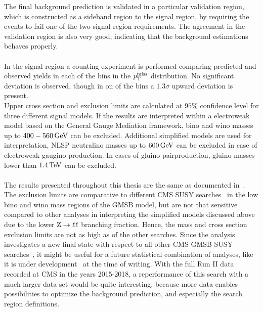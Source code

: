 The final background prediction is validated in a particular validation region, which is constructed as a sideband region to the signal region, by requiring the events to fail one of the two signal region requirements. The agreement in the validation region is also very good, indicating that the background estimations behaves properly.\\\\
In the signal region a counting experiment is performed comparing predicted and observed yields in each of the bins in the $p_{\mathrm{T}}^\text{miss}$ distribution. No significant deviation is observed, though in on of the bins a $1.3\sigma$ upward deviation is present.\\
Upper cross section and exclusion limits are calculated at $95\%$ confidence level for three different signal models. If the results are interpreted within a electroweak model based on the General Gauge Mediation framework, bino and wino masses up to $400-560\,\text{Ge\hspace{-.08em}V}$ can be excluded. Additional simplified models are used for interpretation, NLSP neutralino masses up to $600\,\text{Ge\hspace{-.08em}V}$ can be excluded in case of electroweak gaugino production. In cases of gluino pairproduction, gluino masses lower than $1.4\,\text{Te\hspace{-.08em}V}$ can be excluded.\\\\
The results presented throughout this thesis are the same as documented in~\cite{MyAN}. The exclusion limits are comparative to different CMS SUSY searches~\cite{PhotonMet} in the low bino and wino mass regions of the GMSB model, but are not that sensitive compared to other analyses in interpreting the simplified models discussed above due to the lower $\mathrm{Z}\to\ell\ell$ branching fraction. Hence, the mass and cross section exclusion limits are not as high as of the other searches. Since the analysis investigates a new final state with respect to all other CMS GMSB SUSY searches~\cite{PhotonMet,PhotonHT,PhotonBJet}, it might be useful for a future statistical combination of analyses, like it is under development~\cite{Danilo} at the time of writing. With the full Run II data recorded at CMS in the years 2015-2018, a reperformance of this search with a much larger data set would be quite interesting, because more data enables possibilities to optimize the background prediction, and especially the search region definitions.
